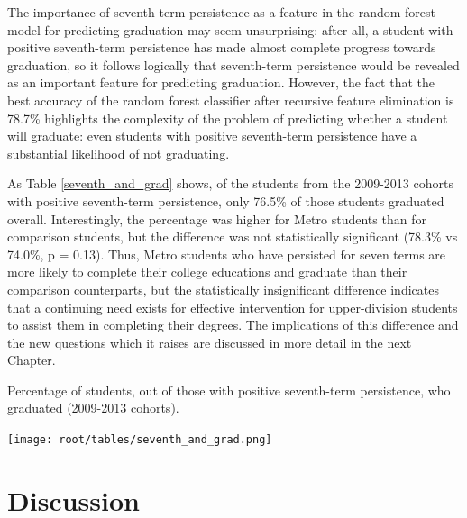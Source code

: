 The importance of seventh-term persistence as a feature in the random forest model for predicting graduation may seem unsurprising: after all, a student with positive seventh-term persistence has made almost complete progress towards graduation, so it follows logically that seventh-term persistence would be revealed as an important feature for predicting graduation.  However, the fact that the best accuracy of the random forest classifier after recursive feature elimination is 78.7\% highlights the complexity of the problem of predicting whether a student will graduate: even students with positive seventh-term persistence have a substantial likelihood of not graduating.  

As Table \ref{seventh_and_grad} shows, of the students from the 2009-2013 cohorts with positive seventh-term persistence, only 76.5\% of those students graduated overall.  Interestingly, the percentage was higher for Metro students than for comparison students, but the difference was not statistically significant (78.3\% vs 74.0\%, p = 0.13).  Thus, Metro students who have persisted for seven terms are more likely to complete their college educations and graduate than their comparison counterparts, but the statistically insignificant difference indicates that a continuing need exists for effective intervention for upper-division students to assist them in completing their degrees.  The implications of this difference and the new questions which it raises are discussed in more detail in the next Chapter.

\begin{table}[htbp]
\centering
\caption{Percentage of students, out of those with positive seventh-term persistence, who graduated (2009-2013 cohorts).}
\texttt{[image: root/tables/seventh\_and\_grad.png]}
\label{seventh_and_grad}
\end{table}


\chapter{Discussion}
\label{Chapter_Discussion}

